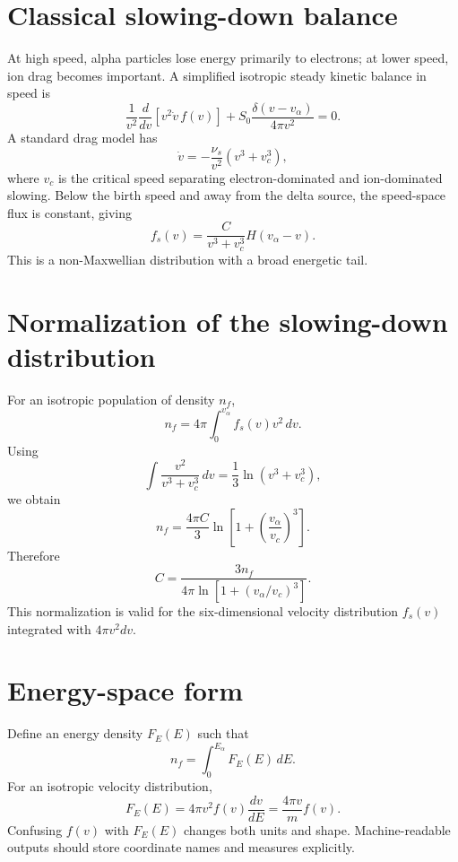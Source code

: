 \documentclass[11pt]{article}
\begin{document}
\section{Classical slowing-down balance}
At high speed, alpha particles lose energy primarily to electrons; at lower speed, ion drag becomes important. A simplified isotropic steady kinetic balance in speed is
\begin{equation}
\frac{1}{v^2}\frac{d}{dv}\left[v^2\dot v\,f(v)\right]
+S_0\frac{\delta(v-v_\alpha)}{4\pi v^2}=0.
\end{equation}
A standard drag model has
\begin{equation}
\dot v=-\frac{\nu_s}{v^2}(v^3+v_c^3),
\end{equation}
where $v_c$ is the critical speed separating electron-dominated and ion-dominated slowing. Below the birth speed and away from the delta source, the speed-space flux is constant, giving
\begin{equation}
\boxed{f_s(v)=\frac{C}{v^3+v_c^3}H(v_\alpha-v)}.
\end{equation}
This is a non-Maxwellian distribution with a broad energetic tail.

\section{Normalization of the slowing-down distribution}
For an isotropic population of density $n_f$,
\begin{equation}
n_f=4\pi\int_0^{v_\alpha} f_s(v)v^2\,dv.
\end{equation}
Using
\begin{equation}
\int\frac{v^2}{v^3+v_c^3}\,dv
=\frac{1}{3}\ln(v^3+v_c^3),
\end{equation}
we obtain
\begin{equation}
n_f=\frac{4\pi C}{3}
\ln\!\left[1+\left(\frac{v_\alpha}{v_c}\right)^3\right].
\end{equation}
Therefore
\begin{equation}
\boxed{C=\frac{3n_f}{4\pi
\ln\!\left[1+(v_\alpha/v_c)^3\right]}}.
\end{equation}
This normalization is valid for the six-dimensional velocity distribution $f_s(v)$ integrated with $4\pi v^2dv$.

\section{Energy-space form}
Define an energy density $F_E(E)$ such that
\begin{equation}
n_f=\int_0^{E_\alpha}F_E(E)\,dE.
\end{equation}
For an isotropic velocity distribution,
\begin{equation}
F_E(E)=4\pi v^2f(v)\frac{dv}{dE}
=\frac{4\pi v}{m}f(v).
\end{equation}
Confusing $f(v)$ with $F_E(E)$ changes both units and shape. Machine-readable outputs should store coordinate names and measures explicitly.
\end{document}
